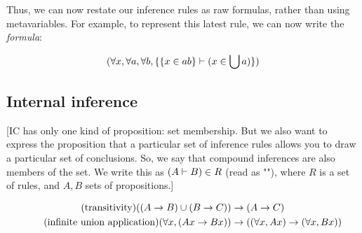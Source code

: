 \documentclass{article}
\begin{document}
  Thus, we can now restate our inference rules as raw formulas, rather than using metavariables. For example, to represent this latest rule, we can now write the \emph{formula}:

  \begin{align*}
    (\forall x, \forall a, \forall b, \{\{x \in ab\} \vdash (x \in \bigcup a)\})\\
  \end{align*}

  \iffalse
  We also define some equivalences of infinite sets. Here are two rules, each stated in two different ways (with combinators, and with named arguments):
  \begin{align*}
    &\vdash A \equals \all (\const A) & &\vdash A \equals (\forall b, A) \\
    &\vdash (\all A) \equals \all (\fuse (\const \atomall) A) & &\vdash (\forall b, Ab) \equals (\forall b, \forall c, A(bc))\\
  \end{align*}
  \fi



  \subsection{Internal inference}

  [IC has only one kind of proposition: set membership. But we also want to express the proposition that a particular set of inference rules allows you to draw a particular set of conclusions. So, we say that compound inferences are also members of the set.
  We write this as $(A \vdash B) \in R$ (read as ""), where $R$ is a set of rules, and $A,B$ sets of propositions.]

  \begin{align*}
    \tag{transitivity}
    ((A \to B) \cup (B \to C)) &\to (A \to C)\\
    \tag{infinite union application}
    (\forall x, (Ax \to Bx)) &\to ((\forall x, Ax) \to (\forall x, Bx))\\
  \end{align*}
\end{document}
